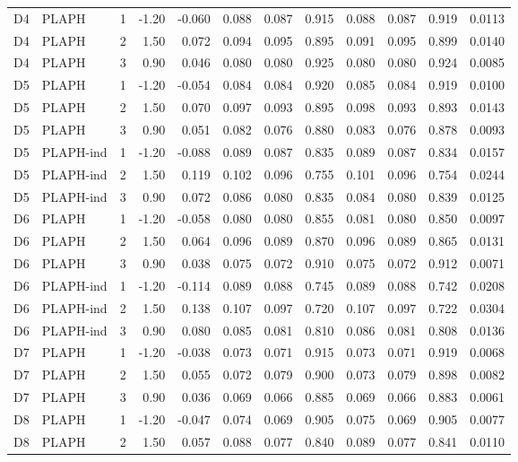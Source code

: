 \begin{longtable}{cllrrrrrrrrr}
D4 & PLAPH & 1 & -1.20 & -0.060 & 0.088 & 0.087 & 0.915 & 0.088 & 0.087 & 0.919 & 0.0113 \\
D4 & PLAPH & 2 & 1.50 & 0.072 & 0.094 & 0.095 & 0.895 & 0.091 & 0.095 & 0.899 & 0.0140 \\
D4 & PLAPH & 3 & 0.90 & 0.046 & 0.080 & 0.080 & 0.925 & 0.080 & 0.080 & 0.924 & 0.0085 \\
D5 & PLAPH & 1 & -1.20 & -0.054 & 0.084 & 0.084 & 0.920 & 0.085 & 0.084 & 0.919 & 0.0100 \\
D5 & PLAPH & 2 & 1.50 & 0.070 & 0.097 & 0.093 & 0.895 & 0.098 & 0.093 & 0.893 & 0.0143 \\
D5 & PLAPH & 3 & 0.90 & 0.051 & 0.082 & 0.076 & 0.880 & 0.083 & 0.076 & 0.878 & 0.0093 \\
D5 & PLAPH-ind & 1 & -1.20 & -0.088 & 0.089 & 0.087 & 0.835 & 0.089 & 0.087 & 0.834 & 0.0157 \\
D5 & PLAPH-ind & 2 & 1.50 & 0.119 & 0.102 & 0.096 & 0.755 & 0.101 & 0.096 & 0.754 & 0.0244 \\
D5 & PLAPH-ind & 3 & 0.90 & 0.072 & 0.086 & 0.080 & 0.835 & 0.084 & 0.080 & 0.839 & 0.0125 \\
D6 & PLAPH & 1 & -1.20 & -0.058 & 0.080 & 0.080 & 0.855 & 0.081 & 0.080 & 0.850 & 0.0097 \\
D6 & PLAPH & 2 & 1.50 & 0.064 & 0.096 & 0.089 & 0.870 & 0.096 & 0.089 & 0.865 & 0.0131 \\
D6 & PLAPH & 3 & 0.90 & 0.038 & 0.075 & 0.072 & 0.910 & 0.075 & 0.072 & 0.912 & 0.0071 \\
D6 & PLAPH-ind & 1 & -1.20 & -0.114 & 0.089 & 0.088 & 0.745 & 0.089 & 0.088 & 0.742 & 0.0208 \\
D6 & PLAPH-ind & 2 & 1.50 & 0.138 & 0.107 & 0.097 & 0.720 & 0.107 & 0.097 & 0.722 & 0.0304 \\
D6 & PLAPH-ind & 3 & 0.90 & 0.080 & 0.085 & 0.081 & 0.810 & 0.086 & 0.081 & 0.808 & 0.0136 \\
D7 & PLAPH & 1 & -1.20 & -0.038 & 0.073 & 0.071 & 0.915 & 0.073 & 0.071 & 0.919 & 0.0068 \\
D7 & PLAPH & 2 & 1.50 & 0.055 & 0.072 & 0.079 & 0.900 & 0.073 & 0.079 & 0.898 & 0.0082 \\
D7 & PLAPH & 3 & 0.90 & 0.036 & 0.069 & 0.066 & 0.885 & 0.069 & 0.066 & 0.883 & 0.0061 \\
D8 & PLAPH & 1 & -1.20 & -0.047 & 0.074 & 0.069 & 0.905 & 0.075 & 0.069 & 0.905 & 0.0077 \\
D8 & PLAPH & 2 & 1.50 & 0.057 & 0.088 & 0.077 & 0.840 & 0.089 & 0.077 & 0.841 & 0.0110 \\

\end{longtable}
